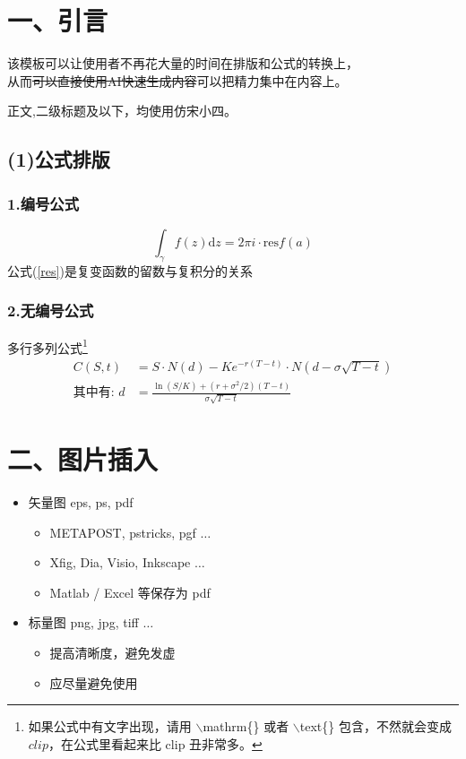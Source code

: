 \documentclass[a4paper]{article}
\newcommand{\dd}{\mathrm{d}} %
\newcommand{\zhengwen}{\CJKfamily{fsong}\fontsize{12pt}{28pt}\selectfont}
\begin{document}
{\zhengwen
\section*{一、引言}

该模板可以让使用者不再花大量的时间在排版和公式的转换上，\\
从而\sout{可以直接使用AI快速生成内容}可以把精力集中在内容上。\par

正文,二级标题及以下，均使用仿宋小四。\par

\subsection*{(1)公式排版}

    \subsubsection*{1.编号公式}
        \begin{equation}
            \int_{\gamma}^{}f(z)\dd z=2\pi i\cdot \mathrm{res}f(a)
        \label{res}
        \end{equation}
公式(\ref{res})是复变函数的留数与复积分的关系
    \subsubsection*{2.无编号公式}
        
        多行多列公式\footnote{如果公式中有文字出现，请用 $\backslash$mathrm\{\} 或者 $\backslash$text\{\} 包含，不然就会变成 $clip$，在公式里看起来比 $\mathrm{clip}$ 丑非常多。}
        \begin{align*}
            C(S, t) &= S \cdot N(d) - K e^{-r(T-t)} \cdot N(d - \sigma \sqrt{T-t})
            \\ \text{其中有:~} d &= \frac{\ln(S/K) + (r + \sigma^2/2)(T-t)}{\sigma \sqrt{T-t}}
        \end{align*}

\section*{二、图片插入}

\begin{itemize}
        \item 矢量图 eps, ps, pdf
        \begin{itemize}
            \item METAPOST, pstricks, pgf $\ldots$
            \item Xfig, Dia, Visio, Inkscape $\ldots$
            \item Matlab / Excel 等保存为 pdf
        \end{itemize}
        \item 标量图 png, jpg, tiff $\ldots$
        \begin{itemize}
            \item 提高清晰度，避免发虚
            \item 应尽量避免使用
        \end{itemize}
\end{itemize}

}
\end{document}
